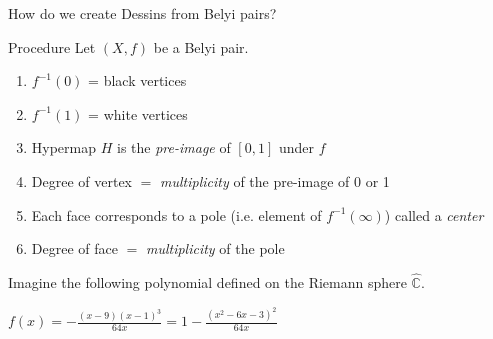 \documentclass{beamer}
\newcommand{\CC}{\mathbb{C}}
\begin{document}
\begin{frame}{How do we create Dessins from Belyi pairs?}
    \begin{block}{Procedure}
    Let $(X,f)$ be a Belyi pair. 
    \begin{enumerate}
        \item $f^{-1}(0)$ = black vertices
        \item $f^{-1}(1)$ = white vertices
        \item Hypermap $H$ is the \emph{pre-image} of $[0,1]$ under $f$
        \item Degree of vertex $=$ \emph{multiplicity} of the pre-image of 0 or 1
        \item Each face corresponds to a pole (i.e. element of $f^{-1}(\infty)$) called a \emph{center}
        \item Degree of face $=$ \emph{multiplicity} of the pole
    \end{enumerate}
    \end{block}
    
    \begin{example}
    Imagine the following polynomial defined on the Riemann sphere $\hat{\CC}$.
    \begin{center}
    \large{
        $f(x) = -\frac{(x-9)(x-1)^3}{64x} = 1 - \frac{(x^2 - 6x - 3)^2}{64x} $
    }
    \end{center}
    \end{example}
\end{frame}

\end{document}

